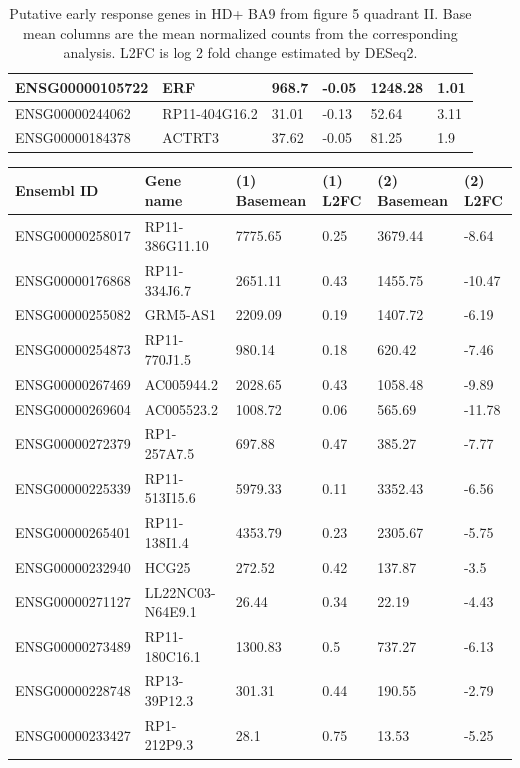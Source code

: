 \documentclass[fleqn,10pt,table]{wlscirep}
\begin{document}
\begin{table}[ht]
\begin{tabular}{|l|l|l|l|l|l|}
ENSG00000105722 & ERF & 968.7 & -0.05 & 1248.28 & 1.01 \\ \hline
ENSG00000244062 & RP11-404G16.2 & 31.01 & -0.13 & 52.64 & 3.11 \\ \hline
ENSG00000184378 & ACTRT3 & 37.62 & -0.05 & 81.25 & 1.9 \\ \hline
\end{tabular}
\caption{Putative early response genes in HD+ BA9 from figure 5 quadrant II. Base mean columns are the mean normalized counts from the corresponding analysis. L2FC is log 2 fold change estimated by DESeq2. \label{tab:early_discordant_genes_II}}
\end{table}

\begin{table}[ht]
\centering
{}
\begin{tabular}{|l|l|l|l|l|l|} \hline
Ensembl ID & Gene name & (1) Basemean & (1) L2FC & (2) Basemean & (2) L2FC \\ \hline
ENSG00000258017 & RP11-386G11.10 & 7775.65 & 0.25 & 3679.44 & -8.64 \\ \hline
ENSG00000176868 & RP11-334J6.7 & 2651.11 & 0.43 & 1455.75 & -10.47 \\ \hline
ENSG00000255082 & GRM5-AS1 & 2209.09 & 0.19 & 1407.72 & -6.19 \\ \hline
ENSG00000254873 & RP11-770J1.5 & 980.14 & 0.18 & 620.42 & -7.46 \\ \hline
ENSG00000267469 & AC005944.2 & 2028.65 & 0.43 & 1058.48 & -9.89 \\ \hline
ENSG00000269604 & AC005523.2 & 1008.72 & 0.06 & 565.69 & -11.78 \\ \hline
ENSG00000272379 & RP1-257A7.5 & 697.88 & 0.47 & 385.27 & -7.77 \\ \hline
ENSG00000225339 & RP11-513I15.6 & 5979.33 & 0.11 & 3352.43 & -6.56 \\ \hline
ENSG00000265401 & RP11-138I1.4 & 4353.79 & 0.23 & 2305.67 & -5.75 \\ \hline
ENSG00000232940 & HCG25 & 272.52 & 0.42 & 137.87 & -3.5 \\ \hline
ENSG00000271127 & LL22NC03-N64E9.1 & 26.44 & 0.34 & 22.19 & -4.43 \\ \hline
ENSG00000273489 & RP11-180C16.1 & 1300.83 & 0.5 & 737.27 & -6.13 \\ \hline
ENSG00000228748 & RP13-39P12.3 & 301.31 & 0.44 & 190.55 & -2.79 \\ \hline
ENSG00000233427 & RP1-212P9.3 & 28.1 & 0.75 & 13.53 & -5.25 \\ \hline

\end{tabular}
\end{table}
\end{document}
